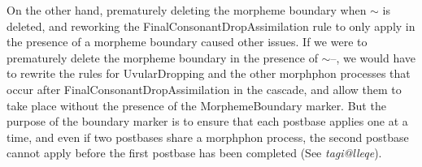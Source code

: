 \documentclass{article}
\begin{document}
\begin{enumerate}
On the other hand, prematurely deleting the morpheme boundary when $\sim$ is deleted, and reworking the FinalConsonantDropAssimilation rule to only apply in the presence of a morpheme boundary caused other issues.
%
If we were to prematurely delete the morpheme boundary in the presence of $\sim$--, we would have to rewrite the rules for UvularDropping and the other morphphon processes that occur after FinalConsonantDropAssimilation in the cascade, and allow them to take place without the presence of the MorphemeBoundary marker.
%
But the purpose of the boundary marker is to ensure that each postbase applies one at a time, and even if two postbases share a morphphon process, the second postbase cannot apply before the first postbase has been completed (See \textit{tagi@lleqe}).

\end{enumerate}
\end{document}
